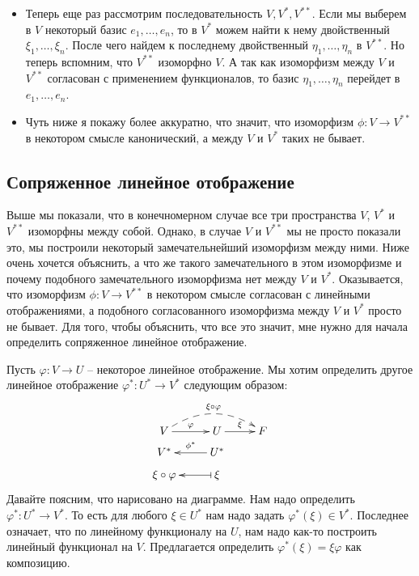 \begin{itemize}
\item Теперь еще раз рассмотрим последовательность $V, V^*, V^{**}$.
Если мы выберем в $V$ некоторый базис $e_1,\ldots,e_n$, то в $V^*$ можем найти к нему двойственный $\xi_1,\ldots,\xi_n$.
После чего найдем к последнему двойственный $\eta_1,\ldots,\eta_n$ в $V^{**}$.
Но теперь вспомним, что $V^{**}$ изоморфно $V$.
А так как изоморфизм между $V$ и $V^{**}$ согласован с применением функционалов, то базис $\eta_1,\ldots,\eta_n$ перейдет в $e_1,\ldots,e_n$.

\item Чуть ниже я покажу более аккуратно, что значит, что изоморфизм $\phi\colon V\to V^{**}$ в некотором смысле канонический, а между $V$ и $V^*$ таких не бывает.
\end{itemize}


\subsection{Сопряженное линейное отображение}

Выше мы показали, что в конечномерном случае все три пространства $V$, $V^*$ и $V^{**}$ изоморфны между собой.
Однако, в случае $V$ и $V^{**}$ мы не просто показали это, мы построили некоторый замечательнейший изоморфизм между ними.
Ниже очень хочется объяснить, а что же такого замечательного в этом изоморфизме и почему подобного замечательного изоморфизма нет между $V$ и $V^*$.
Оказывается, что изоморфизм $\phi\colon V \to V^{**}$ в некотором смысле согласован с линейными отображениями, а подобного согласованного изоморфизма между $V$ и $V^*$ просто не бывает.
Для того, чтобы объяснить, что все это значит, мне нужно для начала определить сопряженное линейное отображение.

Пусть $\varphi\colon V\to U$ -- некоторое линейное отображение.
Мы хотим определить другое линейное отображение $\varphi^* \colon U^*\to V^*$ следующим образом:
\[
\xymatrix@R=6pt{
	{V}\ar[r]^{\varphi}\ar@{-->}@/^16pt/[rr]^{\xi\circ \varphi}&{U}\ar[r]^{\xi}&{F}\\
	{V^*}&{U^*}\ar[l]_{\phi^*}&{}\\
	{\xi\circ \varphi}&{\xi}\ar@{|->}[l]&{}\\
}
\]
Давайте поясним, что нарисовано на диаграмме.
Нам надо определить $\varphi^*\colon U^*\to V^*$.
То есть для любого $\xi\in U^*$ нам надо задать $\varphi^*(\xi)\in V^*$.
Последнее означает, что по линейному функционалу на $U$, нам надо как-то построить линейный функционал на $V$.
Предлагается определить $\varphi^*(\xi) = \xi \varphi$ как композицию.

